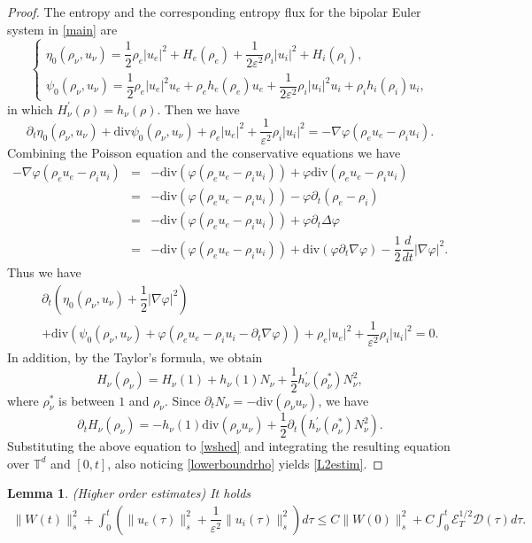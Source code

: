 \documentclass[reqno,twoside,12pt,a4paper]{amsart}
\newcommand{\T}{\mathbb{T}}
\newcommand{\eps}{\mathbb{\varepsilon}}
\newcommand{\dive}{\mathrm{div}}
\newcommand{\pt}{\partial_t}
\newcommand{\D}{\nabla}
\newcommand{\vp}{\varphi}
\newtheorem{lemma}{Lemma}[section]
\numberwithin{equation}{section}
\begin{document}
\begin{proof}The entropy and the corresponding entropy flux for the bipolar  Euler system in \eqref{main} are
\[
\begin{cases}
  \eta_0(\rho_\nu,u_\nu)=\dfrac{1}{2}\rho_e|u_e|^2+ H_e(\rho_e)+ \dfrac{1}{2\eps^2}\rho_i|u_i|^2+H_i(\rho_i),\\[2mm]
  \psi_0(\rho_\nu,u_\nu)=\dfrac{1}{2}\rho_e|u_e|^2u_e+ \rho_eh_e(\rho_e)u_e+\dfrac{1}{2\eps^2}\rho_i|u_i|^2u_i+ \rho_ih_i(\rho_i)u_i,
 \end{cases}
\]
in which $H_\nu^\prime(\rho)=h_\nu(\rho)$. Then we have
\begin{equation*}
 \pt \eta_0(\rho_\nu,u_\nu) +\dive \psi_0(\rho_\nu,u_\nu)+ \rho_e |u_e|^2+\dfrac{1}{\eps^2}\rho_i |u_i|^2 =-\D\vp(\rho_e u_e-\rho_i u_i).
\end{equation*}
Combining the Poisson equation and the conservative equations we have
\begin{eqnarray*}
-\D\vp(\rho_e u_e-\rho_i u_i)&=&-\dive(\vp(\rho_e u_e-\rho_i u_i))+\vp\dive(\rho_e u_e-\rho_i u_i)\nonumber\\
&=&-\dive(\vp(\rho_e u_e-\rho_i u_i))-\vp\pt(\rho_e-\rho_i)\nonumber\\
&=&-\dive(\vp(\rho_e u_e-\rho_i u_i))+\vp\pt\Delta\vp\nonumber\\
&=&-\dive(\vp(\rho_e u_e-\rho_i u_i))+\dive(\vp\pt\D\vp)-\dfrac{1}{2}\dfrac{d}{dt}|\D\vp|^2.\nonumber
\end{eqnarray*}
Thus we have
\begin{eqnarray}\label{wshed}
 &&\pt \left(\eta_0(\rho_\nu,u_\nu)+\dfrac{1}{2}|\D\vp|^2\right)\nonumber\\
 &&+\dive \left(\psi_0(\rho_\nu,u_\nu)+\vp(\rho_eu_e-\rho_iu_i-\pt\D\vp)\right)+ \rho_e |u_e|^2+\dfrac{1}{\eps^2}\rho_i |u_i|^2 =0.
\end{eqnarray}
In addition, by the Taylor's formula, we obtain
\[
H_\nu(\rho_\nu)=H_\nu(1)+h_\nu(1)N_\nu+ \dfrac{1}{2}h_\nu^\prime(\rho_\nu^*)
N_\nu^2,
\]
where $\rho_\nu^*$ is between $1$ and $\rho_\nu$. Since $\pt N_\nu=-\dive(\rho_\nu u_\nu)$, we have
\[
\pt H_\nu(\rho_\nu) =-h_\nu(1)\dive(\rho_\nu u_\nu)+ \dfrac{1}{2}\pt\left(h_\nu^\prime(\rho_\nu^*) N_\nu^2\right).
\]
Substituting the above equation to \eqref{wshed} and integrating the resulting equation over $\T^d$ and $[0,t]$, also noticing \eqref{lowerboundrho} yields \eqref{L2estim}. 
\end{proof}

\begin{lemma}\label{lemmahoestim} (Higher order estimates) It holds
\begin{eqnarray}\label{hoestim}
\|W(t)\|_s^2+\int_0^t\left(\|u_e(\tau)\|_s^2+\dfrac{1}{\eps^2}\|u_i(\tau)\|_s^2\right)d\tau\leq C\|W(0)\|_s^2+C\int_0^t\mathscr{E}_T^{1/2}\mathscr{D}(\tau)d\tau.
\end{eqnarray}
\end{lemma}
\end{document}
